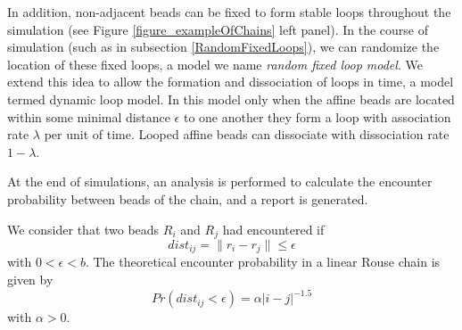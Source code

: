 \documentclass[12pt]{book}
\begin{document}
In addition, non-adjacent beads can be fixed to form stable loops throughout the simulation (see Figure \ref{figure_exampleOfChains} left panel). In the course of simulation (such as in subsection \ref{RandomFixedLoops}), we can randomize the location of these fixed loops, a model we name \textit{random fixed loop model}. We extend this idea to allow the formation and dissociation of loops in time, a model termed dynamic loop model. In this model only when the affine beads are located within some minimal distance $\epsilon$ to one another they form a loop with association rate $\lambda$ per unit of time. Looped affine beads can dissociate with dissociation rate $1-\lambda$.

At the end of simulations, an analysis is performed to calculate the encounter probability between beads of the chain, and a report is generated.  

We consider that two beads $R_i$ and $R_j$ had encountered if
\begin{equation*}
 dist_{ij}=\|r_i-r_j\|\leq \epsilon
\end{equation*}
with $0<\epsilon <b$. The theoretical encounter probability in a linear Rouse chain is given by 
\begin{equation}
Pr(dist_{ij}<\epsilon)= \alpha |i-j|^{-1.5}
\end{equation}
with $\alpha>0$. 
\end{document}
